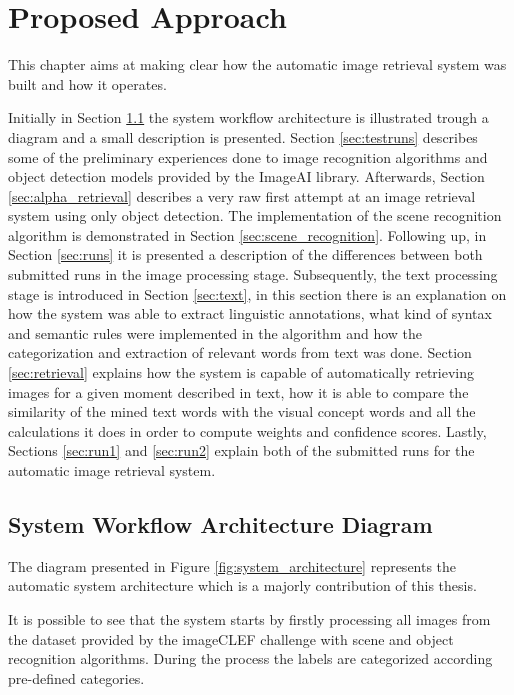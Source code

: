 \cleardoublepage

\chapter{Proposed Approach}
\label{ch:initial_work}

This chapter aims at making clear how the automatic image retrieval system was built and how it operates.



Initially in Section \ref{sec:diagram} the system workflow architecture is illustrated trough a diagram and a small description is presented. Section \ref{sec:testruns} describes some of the preliminary experiences done to image recognition algorithms and object detection models provided by the ImageAI library. Afterwards, Section \ref{sec:alpha_retrieval} describes a very raw first attempt at an image retrieval system using only object detection. The implementation of the scene recognition algorithm is demonstrated in Section \ref{sec:scene_recognition}. Following up, in Section \ref{sec:runs} it is presented a description of the differences between both submitted runs in the image processing stage. Subsequently, the text processing stage is introduced in Section \ref{sec:text}, in this section there is an explanation on how the system was able to extract linguistic annotations, what kind of syntax and semantic rules were implemented in the algorithm and how the categorization and extraction of relevant words from text was done. Section \ref{sec:retrieval} explains how the system is capable of automatically retrieving images for a given moment described in text, how it is able to compare the similarity of the mined text words with the visual concept words and all the calculations it does in order to compute weights and confidence scores. Lastly, Sections \ref{sec:run1} and \ref{sec:run2} explain both of the submitted runs for the automatic image retrieval system. 



\section{System Workflow Architecture Diagram}
\label{sec:diagram}

The diagram presented in Figure \ref{fig:system_architecture} represents the automatic system architecture which is a majorly contribution of this thesis.

It is possible to see that the system starts by firstly processing all images from the dataset provided by the imageCLEF challenge with scene and object recognition algorithms. During the process the labels are categorized according pre-defined categories.

